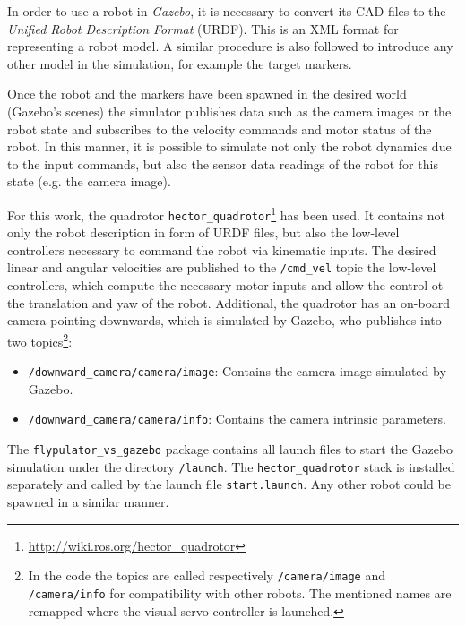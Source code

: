 In order to use a robot in \emph{Gazebo}, it is necessary to convert its CAD files to the \emph{Unified Robot Description Format} (URDF). This is an XML format for representing a robot model. A similar procedure is also followed to introduce any other model in the simulation, for example the target markers.


Once the robot and the markers have been spawned in the desired world (Gazebo's scenes) the simulator publishes data such as the camera images or the robot state and subscribes to the velocity commands and motor status of the robot. In this manner, it is possible to simulate not only the robot dynamics due to the input commands, but also the sensor data readings of the robot for this state (e.g. the camera image).

For this work, the quadrotor \texttt{hector\_quadrotor}\footnote{\url{http://wiki.ros.org/hector_quadrotor}} has been used. It contains not only the robot description in form of URDF files, but also the low-level controllers necessary to command the robot via kinematic inputs. The desired linear and angular velocities are published to the \texttt{/cmd\_vel} topic the low-level controllers, which compute the necessary motor inputs and allow the control ot the translation and yaw of the robot. Additional, the quadrotor has an on-board camera pointing downwards, which is simulated by Gazebo, who publishes into two topics\footnote{In the code the topics are called respectively \texttt{/camera/image} and \texttt{/camera/info} for compatibility with other robots. The mentioned names are remapped where the visual servo controller is launched.}:

\begin{itemize}
	\item \texttt{/downward\_camera/camera/image}: Contains the camera image simulated by Gazebo.
	
	\item \texttt{/downward\_camera/camera/info}: Contains the camera intrinsic parameters.
\end{itemize}

The \texttt{flypulator\_vs\_gazebo} package contains all launch files to start the Gazebo simulation under the directory \texttt{/launch}. The \texttt{hector\_quadrotor} stack is installed separately and called by the launch file \texttt{start.launch}. Any other robot could be spawned in a similar manner.

